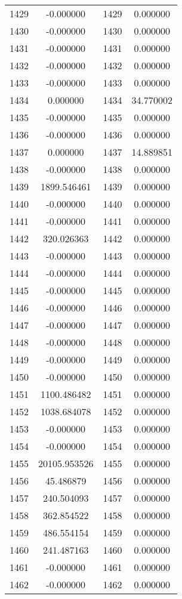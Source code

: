 \documentclass[12pt]{article}
\begin{document}
\begin{longtable}{@{}cccc@{}}
1429 & -0.000000 & 1429 & 0.000000 \\
1430 & -0.000000 & 1430 & 0.000000 \\
1431 & -0.000000 & 1431 & 0.000000 \\
1432 & -0.000000 & 1432 & 0.000000 \\
1433 & -0.000000 & 1433 & 0.000000 \\
1434 & 0.000000 & 1434 & 34.770002 \\
1435 & -0.000000 & 1435 & 0.000000 \\
1436 & -0.000000 & 1436 & 0.000000 \\
1437 & 0.000000 & 1437 & 14.889851 \\
1438 & -0.000000 & 1438 & 0.000000 \\
1439 & 1899.546461 & 1439 & 0.000000 \\
1440 & -0.000000 & 1440 & 0.000000 \\
1441 & -0.000000 & 1441 & 0.000000 \\
1442 & 320.026363 & 1442 & 0.000000 \\
1443 & -0.000000 & 1443 & 0.000000 \\
1444 & -0.000000 & 1444 & 0.000000 \\
1445 & -0.000000 & 1445 & 0.000000 \\
1446 & -0.000000 & 1446 & 0.000000 \\
1447 & -0.000000 & 1447 & 0.000000 \\
1448 & -0.000000 & 1448 & 0.000000 \\
1449 & -0.000000 & 1449 & 0.000000 \\
1450 & -0.000000 & 1450 & 0.000000 \\
1451 & 1100.486482 & 1451 & 0.000000 \\
1452 & 1038.684078 & 1452 & 0.000000 \\
1453 & -0.000000 & 1453 & 0.000000 \\
1454 & -0.000000 & 1454 & 0.000000 \\
1455 & 20105.953526 & 1455 & 0.000000 \\
1456 & 45.486879 & 1456 & 0.000000 \\
1457 & 240.504093 & 1457 & 0.000000 \\
1458 & 362.854522 & 1458 & 0.000000 \\
1459 & 486.554154 & 1459 & 0.000000 \\
1460 & 241.487163 & 1460 & 0.000000 \\
1461 & -0.000000 & 1461 & 0.000000 \\
1462 & -0.000000 & 1462 & 0.000000 \\

\end{longtable}
\end{document}
